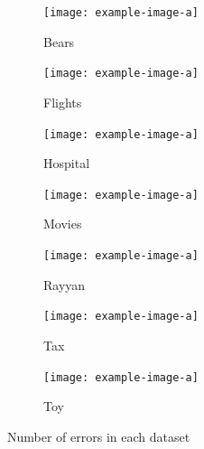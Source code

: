 \begin{figure}[!t]
    \centering 
    \centering
\begin{subfigure}{0.4\textwidth}
    \texttt{[image: example-image-a]}
    \caption{\label{exp:barplot_error_count_bears}Bears}
\end{subfigure}
\hfill
\begin{subfigure}{0.4\textwidth}
    \texttt{[image: example-image-a]}
    \caption{\label{exp:barplot_error_count_flights}Flights}
\end{subfigure}
\hfill
\begin{subfigure}{0.4\textwidth}
    \texttt{[image: example-image-a]}
    \caption{\label{fig:barplot_error_count_hospital}Hospital}
\end{subfigure}
\hfill
\begin{subfigure}{0.4\textwidth}
    \texttt{[image: example-image-a]}
    \caption{\label{exp:barplot_error_count_movies}Movies}
\end{subfigure}
\hfill
\begin{subfigure}{0.4\textwidth}
    \texttt{[image: example-image-a]}
    \caption{\label{exp:barplot_error_count_rayyan}Rayyan}
\end{subfigure}
\hfill
\begin{subfigure}{0.4\textwidth}
    \texttt{[image: example-image-a]}
    \caption{\label{exp:barplot_error_count_tax}Tax}
\end{subfigure}
\hfill
\begin{subfigure}{0.4\textwidth}
    \texttt{[image: example-image-a]}
    \caption{\label{exp:barplot_error_count_toy}Toy}
\end{subfigure}
\caption{Number of errors in each dataset}
\label{exp:barplot_error_counts_datasets}
\end{figure}